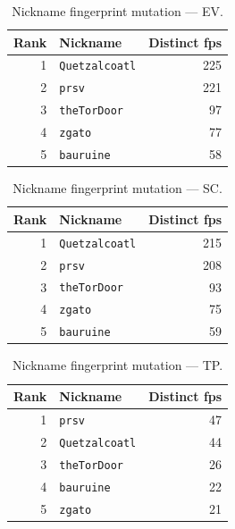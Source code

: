 \documentclass[conference]{IEEEtran}
\begin{document}
\begin{table}[H]
\caption{Nickname fingerprint mutation --- EV.}
\begin{center}\small
\begin{tabular}{|r|l|r|}
\hline
\textbf{Rank} & \textbf{Nickname} & \textbf{Distinct fps} \\ \hline
1 & \texttt{Quetzalcoatl} & 225 \\ \hline
2 & \texttt{prsv} & 221 \\ \hline
3 & \texttt{theTorDoor} & 97 \\ \hline
4 & \texttt{zgato} & 77 \\ \hline
5 & \texttt{bauruine} & 58 \\ \hline
\end{tabular}
\label{tab:fpchg_ephemeral_variable}
\end{center}\end{table}
 
\begin{table}[H]
\caption{Nickname fingerprint mutation --- SC.}
\begin{center}\small
\begin{tabular}{|r|l|r|}
\hline
\textbf{Rank} & \textbf{Nickname} & \textbf{Distinct fps} \\ \hline
1 & \texttt{Quetzalcoatl} & 215 \\ \hline
2 & \texttt{prsv} & 208 \\ \hline
3 & \texttt{theTorDoor} & 93 \\ \hline
4 & \texttt{zgato} & 75 \\ \hline
5 & \texttt{bauruine} & 59 \\ \hline
\end{tabular}
\label{tab:fpchg_static_control}
\end{center}\end{table}
 
\begin{table}[H]
\caption{Nickname fingerprint mutation --- TP.}
\begin{center}\small
\begin{tabular}{|r|l|r|}
\hline
\textbf{Rank} & \textbf{Nickname} & \textbf{Distinct fps} \\ \hline
1 & \texttt{prsv} & 47 \\ \hline
2 & \texttt{Quetzalcoatl} & 44 \\ \hline
3 & \texttt{theTorDoor} & 26 \\ \hline
4 & \texttt{bauruine} & 22 \\ \hline
5 & \texttt{zgato} & 21 \\ \hline
\end{tabular}
\label{tab:fpchg_third_party_probe}
\end{center}\end{table}
 
\end{document}
